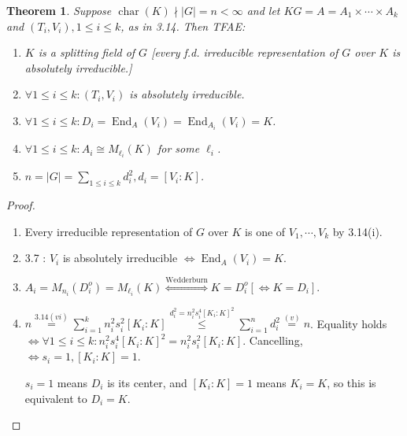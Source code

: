 \documentclass{article}
\theoremstyle{definition}
\theoremstyle{plain}
\newtheorem{theorem}{Theorem}[section]
\theoremstyle{remark}
\begin{document}
    \begin{theorem}
        Suppose \(\operatorname{char}(K) \nmid \vert G \vert = n < \infty\) and let \(KG = A = A_1 \times \cdots \times A_k\) and \((T_i , V_i), 1 \leq i \leq k\), as in 3.14. Then TFAE:
        
        \begin{enumerate}[label=\roman*)]
            \item \(K\) is a splitting field of \(G\) [every f.d. irreducible representation of \(G\) over \(K\) is absolutely irreducible.]
            \item \(\forall 1 \leq i \leq k : (T_i , V_i)\) is absolutely irreducible.
            \item \(\forall 1 \leq i \leq k : D_i = \operatorname{End}_A(V_i) = \operatorname{End}_{A_i}(V_i) = K\).
            \item \(\forall 1 \leq i \leq k : A_i \cong M_{\ell_i}(K)\) for some \(\ell_i\). 
            \item \(n = \vert G \vert = \sum_{1 \leq i \leq k} d_i^2 , d_i = [V_i : K]\).
        \end{enumerate} 
    \end{theorem}

    \begin{proof}

        \ \

        \begin{enumerate}
            \item[i \(\iff\) ii:] Every irreducible representation of \(G\) over \(K\) is one of \(V_1 , \cdots , V_k\) by 3.14(i).
            \item[ii \(\iff\) iii:] 3.7 : \(V_i\) is absolutely irreducible \(\iff \operatorname{End}_A(V_i) = K\).
            \item[iii \(\iff\) iv:] \(A_i = M_{n_i}(D_i^o) = M_{\ell_i}(K) \overset{\text{Wedderburn}}{\iff} K = D_i^o [\iff K = D_i]\).
            \item[v \(\iff\) iii] \(n \overset{3.14(vi)}{=} \sum_{i=1}^k n_i^2 s_i^2 [K_i : K] \overset{d_i^2 = n_i^2 s_i^4 [K_i : K]^2}{\leq} \sum_{i=1}^n d_i^2 \overset{(v)}{=} n\). Equality holds \(\iff \forall 1 \leq i \leq k: n_i^2 s_i^4 [K_i : K]^2 = n_i^2 s_i^2 [K_i : K]\). Cancelling, \(\iff s_i = 1, [K_i : K] = 1\).
            
            \(s_i = 1\) means \(D_i\) is its center, and \([K_i : K] = 1\) means \(K_i = K\), so this is equivalent to \(D_i = K\).
        \end{enumerate}
    \end{proof}
\end{document}
